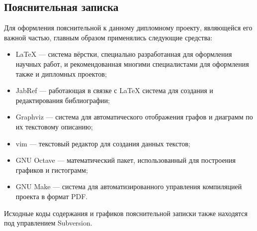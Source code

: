 \subsection{Пояснительная записка}
Для оформления пояснительной к данному дипломному проекту, являющейся его важной частью\cite{recursion}, главным образом применялись следующие средства:
\begin{itemize}
	\item
		\LaTeX\cite{latex} --- система вёрстки, специально разработанная для оформления научных работ, и рекомендованная многими специалистами для оформления также и дипломных проектов\cite{diplatex};
	\item
		JabRef\cite{jabref} --- работающая в связке с \LaTeX{} система для создания и редактирования библиографии;
	\item
		Graphviz\cite{graphviz} --- система для автоматического отображения графов и диаграмм по их текстовому описанию;
	\item
		vim --- текстовый редактор для создания данных текстов;
	\item
		GNU Octave\cite{octave} --- математический пакет, использованный для построения графиков и гистограмм;
	\item
		GNU Make\cite{make} --- система для автоматизированного управления компиляцией проекта в формат PDF.
\end{itemize}

Исходные коды содержания и графиков пояснительной записки также находятся под управлением Subversion.
